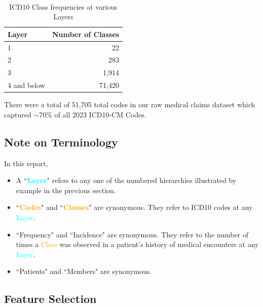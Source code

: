 \documentclass[twoside,11pt]{article}
\begin{document}
\

\begin{table}[H]
  \centering
  \begin{tabular}{|l|r|}
      \hline
    \textbf{Layer} & Number of \textbf{Classes} \\
    \hline
    \hline
    1 & 22 \\
    \hline
    2 & 283 \\
    \hline
    3 & 1,914 \\
    \hline
    4 and below & 71,420 \\
       \hline
  \end{tabular}
  \caption{ICD10 Class frequencies at various Layers}
  \label{table:icd10classfrequency}
\end{table}

There were a total of 51,705 total codes in our raw medical claims dataset which captured $\sim$70\% of all 2023 ICD10-CM Codes.


\subsection{Note on Terminology}

In this report,
\begin{itemize}
	\item A ``\textcolor{cyan}{\textbf{Layer}}" refers to any one of the numbered hierarchies illustrated by example in the previous section.
  \item ``\textcolor{orange}{\textbf{Codes}}" and ``\textcolor{orange}{\textbf{Classes}}" are synonymous. They refer to ICD10 codes at any \textcolor{cyan}{Layer}.
  \item ``Frequency" and ``Incidence" are synonymous. They refer to the number of times a \textcolor{orange}{Class} was observed in a patient's history of medical encounters at any \textcolor{cyan}{Layer}.
  \item ``Patients" and ``Members" are synonymous.

\end{itemize}

\newpage


\subsection{Feature Selection}
\end{document}

